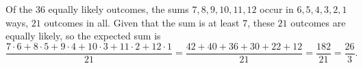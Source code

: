 Of the $36$ equally likely outcomes, the sums $7,8,9,10,11,12$ occur in $6,5,4,3,2,1$ ways, $21$ outcomes in all. Given that the sum is at least $7$, these $21$ outcomes are equally likely, so the expected sum is
\[\dfrac{7\cdot6+8\cdot5+9\cdot4+10\cdot3+11\cdot2+12\cdot1}{21}=\dfrac{42+40+36+30+22+12}{21}=\dfrac{182}{21}=\boxed{\dfrac{26}{3}}.\]
